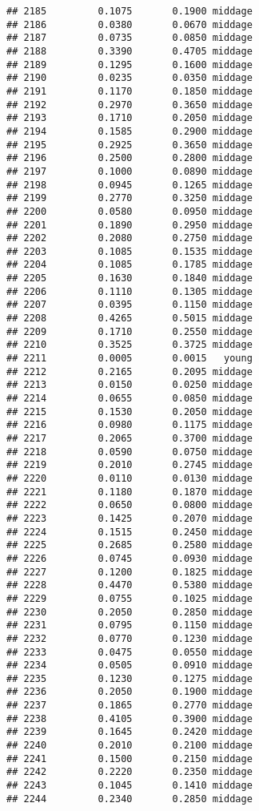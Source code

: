 \documentclass[
]{article}
\begin{document}
\begin{verbatim}
## 2185         0.1075       0.1900 middage
## 2186         0.0380       0.0670 middage
## 2187         0.0735       0.0850 middage
## 2188         0.3390       0.4705 middage
## 2189         0.1295       0.1600 middage
## 2190         0.0235       0.0350 middage
## 2191         0.1170       0.1850 middage
## 2192         0.2970       0.3650 middage
## 2193         0.1710       0.2050 middage
## 2194         0.1585       0.2900 middage
## 2195         0.2925       0.3650 middage
## 2196         0.2500       0.2800 middage
## 2197         0.1000       0.0890 middage
## 2198         0.0945       0.1265 middage
## 2199         0.2770       0.3250 middage
## 2200         0.0580       0.0950 middage
## 2201         0.1890       0.2950 middage
## 2202         0.2080       0.2750 middage
## 2203         0.1085       0.1535 middage
## 2204         0.1085       0.1785 middage
## 2205         0.1630       0.1840 middage
## 2206         0.1110       0.1305 middage
## 2207         0.0395       0.1150 middage
## 2208         0.4265       0.5015 middage
## 2209         0.1710       0.2550 middage
## 2210         0.3525       0.3725 middage
## 2211         0.0005       0.0015   young
## 2212         0.2165       0.2095 middage
## 2213         0.0150       0.0250 middage
## 2214         0.0655       0.0850 middage
## 2215         0.1530       0.2050 middage
## 2216         0.0980       0.1175 middage
## 2217         0.2065       0.3700 middage
## 2218         0.0590       0.0750 middage
## 2219         0.2010       0.2745 middage
## 2220         0.0110       0.0130 middage
## 2221         0.1180       0.1870 middage
## 2222         0.0650       0.0800 middage
## 2223         0.1425       0.2070 middage
## 2224         0.1515       0.2450 middage
## 2225         0.2685       0.2580 middage
## 2226         0.0745       0.0930 middage
## 2227         0.1200       0.1825 middage
## 2228         0.4470       0.5380 middage
## 2229         0.0755       0.1025 middage
## 2230         0.2050       0.2850 middage
## 2231         0.0795       0.1150 middage
## 2232         0.0770       0.1230 middage
## 2233         0.0475       0.0550 middage
## 2234         0.0505       0.0910 middage
## 2235         0.1230       0.1275 middage
## 2236         0.2050       0.1900 middage
## 2237         0.1865       0.2770 middage
## 2238         0.4105       0.3900 middage
## 2239         0.1645       0.2420 middage
## 2240         0.2010       0.2100 middage
## 2241         0.1500       0.2150 middage
## 2242         0.2220       0.2350 middage
## 2243         0.1045       0.1410 middage
## 2244         0.2340       0.2850 middage

\end{verbatim}
\end{document}
